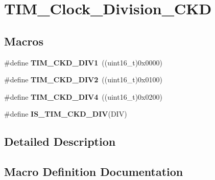 \hypertarget{group___t_i_m___clock___division___c_k_d}{}\section{T\+I\+M\+\_\+\+Clock\+\_\+\+Division\+\_\+\+C\+KD}
\label{group___t_i_m___clock___division___c_k_d}
\subsection*{Macros}
\begin{DoxyCompactItemize}
\item 
\#define {\bfseries T\+I\+M\+\_\+\+C\+K\+D\+\_\+\+D\+I\+V1}~((uint16\+\_\+t)0x0000)\hypertarget{group___t_i_m___clock___division___c_k_d_ga88691a07b3976791977d280045b3c850}{}\label{group___t_i_m___clock___division___c_k_d_ga88691a07b3976791977d280045b3c850}

\item 
\#define {\bfseries T\+I\+M\+\_\+\+C\+K\+D\+\_\+\+D\+I\+V2}~((uint16\+\_\+t)0x0100)\hypertarget{group___t_i_m___clock___division___c_k_d_ga46a5fd6a173a7e88528a6e4084a08665}{}\label{group___t_i_m___clock___division___c_k_d_ga46a5fd6a173a7e88528a6e4084a08665}

\item 
\#define {\bfseries T\+I\+M\+\_\+\+C\+K\+D\+\_\+\+D\+I\+V4}~((uint16\+\_\+t)0x0200)\hypertarget{group___t_i_m___clock___division___c_k_d_gac2e5c030f964f9b4c92fa8129fb923bc}{}\label{group___t_i_m___clock___division___c_k_d_gac2e5c030f964f9b4c92fa8129fb923bc}

\item 
\#define {\bfseries I\+S\+\_\+\+T\+I\+M\+\_\+\+C\+K\+D\+\_\+\+D\+IV}(D\+IV)
\end{DoxyCompactItemize}


\subsection{Detailed Description}


\subsection{Macro Definition Documentation}
